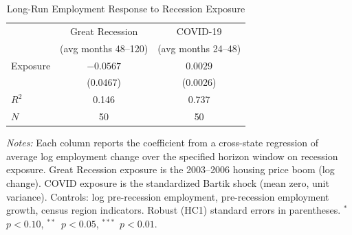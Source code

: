\begin{table}[H]
\centering
\caption{Long-Run Employment Response to Recession Exposure}
\begin{threeparttable}
\begin{tabular}{lcc}
\toprule
& Great Recession & COVID-19 \\
& (avg months 48--120) & (avg months 24--48) \\
\midrule
Exposure & $-0.0567$ & $0.0029$ \\
& (0.0467) & (0.0026) \\
$R^2$ & 0.146 & 0.737 \\
\midrule
$N$ & 50 & 50 \\
\bottomrule
\end{tabular}
\begin{tablenotes}[flushleft]
\small
\item \textit{Notes:} Each column reports the coefficient from a cross-state regression of average log employment change over the specified horizon window on recession exposure. Great Recession exposure is the 2003--2006 housing price boom (log change). COVID exposure is the standardized Bartik shock (mean zero, unit variance). Controls: log pre-recession employment, pre-recession employment growth, census region indicators. Robust (HC1) standard errors in parentheses. $^{*}$~$p<0.10$, $^{**}$~$p<0.05$, $^{***}$~$p<0.01$.
\end{tablenotes}
\end{threeparttable}
\label{tab:main}
\end{table}
